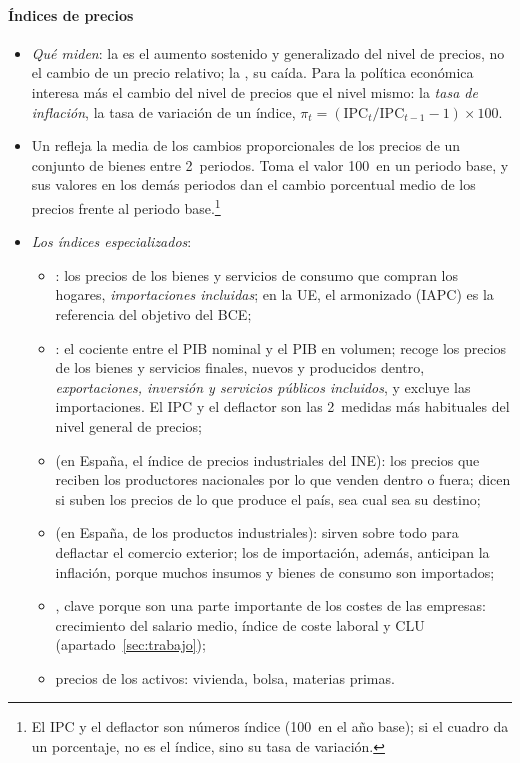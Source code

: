\documentclass[11pt]{article}
\begin{document}
\paragraph{Índices de precios}
\begin{itemize}
\item \emph{Qué miden}: la  es el aumento sostenido y generalizado del nivel de precios, no el cambio de un precio relativo; la , su caída. Para la política económica interesa más el cambio del nivel de precios que el nivel mismo: la \emph{tasa de inflación}, la tasa de variación de un índice, $\pi_t=(\mathrm{IPC}_t/\mathrm{IPC}_{t-1}-1)\times100$.
\item Un  refleja la media de los cambios proporcionales de los precios de un conjunto de bienes entre 2~periodos. Toma el valor 100~en un periodo base, y sus valores en los demás periodos dan el cambio porcentual medio de los precios frente al periodo base.\footnote{El IPC y el deflactor son números índice (100~en el año base); si el cuadro da un porcentaje, no es el índice, sino su tasa de variación.}
\item \emph{Los índices especializados}:
  \begin{itemize}
  \item {}: los precios de los bienes y servicios de consumo que compran los hogares, \emph{importaciones incluidas}; en la UE, el armonizado (IAPC) es la referencia del objetivo del BCE;
  \item {}: el cociente entre el PIB nominal y el PIB en volumen; recoge los precios de los bienes y servicios finales, nuevos y producidos dentro, \emph{exportaciones, inversión y servicios públicos incluidos}, y excluye las importaciones. El IPC y el deflactor son las 2~medidas más habituales del nivel general de precios;
  \item {} (en España, el índice de precios industriales del INE): los precios que reciben los productores nacionales por lo que venden dentro o fuera; dicen si suben los precios de lo que produce el país, sea cual sea su destino;
  \item {} (en España, de los productos industriales): sirven sobre todo para deflactar el comercio exterior; los de importación, además, anticipan la inflación, porque muchos insumos y bienes de consumo son importados;
  \item {}, clave porque son una parte importante de los costes de las empresas: crecimiento del salario medio, índice de coste laboral y CLU (apartado~\ref{sec:trabajo});
  \item precios de los activos: vivienda, bolsa, materias primas.
  \end{itemize}
\end{itemize}
\end{document}
